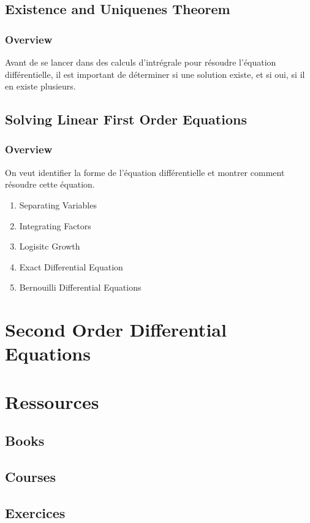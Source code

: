 \documentclass{article}
\begin{document}
\subsection{Existence and Uniquenes Theorem}%
\label{sub:Existence and Uniquenes Theorem}

\subsubsection{Overview}%
\label{sub:Overview}

Avant de se lancer dans des calculs d'intrégrale pour résoudre l'équation
différentielle, il est important de déterminer si une solution existe,
et si oui, si il en existe plusieurs.

\subsection{Solving Linear First Order Equations}%
\label{sub:Solving Linear First Order Equations}

\subsubsection{Overview}%
\label{ssub:Overview}

On veut identifier la forme de l'équation différentielle et montrer
comment résoudre cette équation.

\begin{enumerate}
    \item Separating Variables
    \item Integrating Factors
    \item Logisitc Growth
    \item Exact Differential Equation
    \item Bernouilli Differential Equations
\end{enumerate}




\section{Second Order Differential Equations}

\section{Ressources}%
\label{sec:Ressources}

\subsection{Books}%
\label{sub:Books}

\subsection{Courses}%
\label{sub:Courses}

\subsection{Exercices}%
\label{sub:Exercices}
\end{document}
